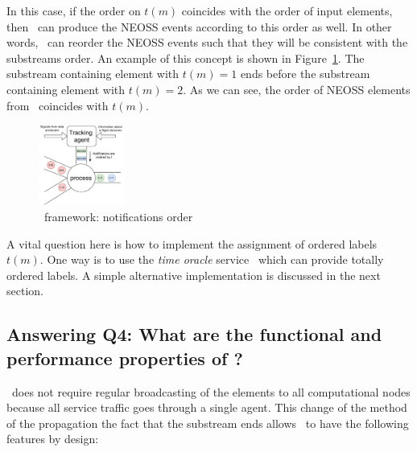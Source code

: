 In this case, if the order on $t(m)$ coincides with the order of input elements, then \tracker\ can produce the NEOSS events according to this order as well. In other words, \tracker\ can reorder the NEOSS events such that they will be consistent with the substreams order. An example of this concept is shown in Figure~\ref{tracker_ordering}. The substream containing element with $t(m)=1$ ends before the substream containing element with $t(m)=2$. As we can see, the order of NEOSS elements from \tracker\ coincides with $t(m)$.

\begin{figure}[htbp]
  \centering
  \includegraphics[width=0.25\textwidth]{pics/tracker-ordering.pdf}
  \caption{\tracker\ framework: notifications order}
  \label{tracker_ordering}
\end{figure}

A vital question here is how to implement the assignment of ordered labels $t(m)$. One way is to use the {\em time oracle} service~\cite{10.14778/3055330.3055335} which can provide totally ordered labels. A simple alternative implementation is discussed in the next section. 

\subsection{Answering Q4: What are the functional and performance properties of \tracker?}

\tracker\ does not require regular broadcasting of the elements to all computational nodes because all service traffic goes through a single agent. This change of the method of the propagation the fact that the substream ends allows \tracker\ to have the following features by design:

